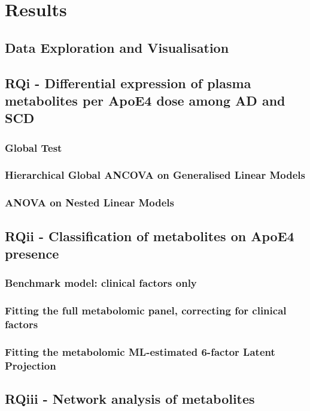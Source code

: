 \documentclass{amsart}
\theoremstyle{plain}
\begin{document}
\clearpage
\section{Results}

\subsection{Data Exploration and Visualisation}

\subsection{RQi - Differential expression of plasma metabolites per ApoE4 dose among AD and SCD}
\subsubsection{Global Test}

\subsubsection{Hierarchical Global ANCOVA on Generalised Linear  Models}

\subsubsection{ANOVA on Nested Linear Models}

\subsection{RQii - Classification of metabolites on ApoE4 presence}

\subsubsection{Benchmark model: clinical factors only}

\subsubsection{Fitting the full metabolomic panel, correcting for clinical factors}

\subsubsection{Fitting the metabolomic ML-estimated 6-factor Latent Projection}

\subsection{RQiii - Network analysis of metabolites}
\end{document}
